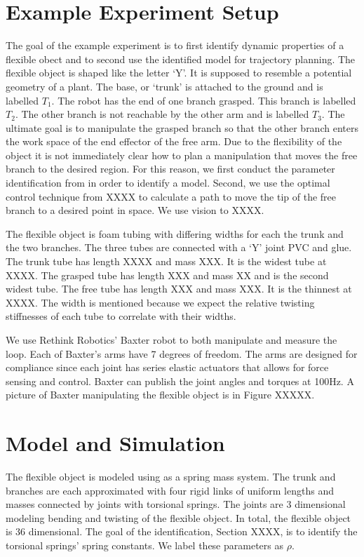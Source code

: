 \documentclass[runningheads,a4paper]{llncs}
\begin{document}
\section{Example Experiment Setup}
The goal of the example experiment is to first identify dynamic properties of a flexible obect and to second use the identified model for trajectory planning. The flexible object is shaped like the letter `Y'.  It is supposed to resemble a potential geometry of a plant. The base, or `trunk' is attached to the ground and is labelled $T_1$. The robot has the end of one branch grasped. This branch is labelled $T_2$.  The other branch is not reachable by the other arm and is labelled $T_3$. The ultimate goal is to manipulate the grasped branch so that the other branch enters the work space of the end effector of the free arm. Due to the flexibility of the object it is not immediately clear how to plan a manipulation that moves the free branch to the desired region. For this reason, we first conduct the parameter identification from \cite{caldwell_coleman_correll_iros} in order to identify a model.  Second, we use the optimal control technique from XXXX to calculate a path to move the tip of the free branch to a desired point in space.  We use vision to XXXX.

The flexible object is foam tubing with differing widths for each the trunk and the two branches. The three tubes are connected with a `Y' joint PVC and glue.  The trunk tube has length XXXX and mass XXX. It is the widest tube at XXXX. The grasped tube has length XXX and mass XX and is the second widest tube. The free tube has length XXX and mass XXX. It is the thinnest at XXXX.  The width is mentioned because we expect the relative twisting stiffnesses of each tube to correlate with their widths. 

We use Rethink Robotics' Baxter \cite{guizzo2011rethink} robot to both manipulate and measure the loop.  Each of Baxter's arms have 7 degrees of freedom.  The arms are designed for compliance since each joint has series elastic actuators that allows for force sensing and control.  Baxter can publish the joint angles and torques at 100Hz.  A picture of Baxter manipulating the flexible object is in Figure XXXXX. 

\section{Model and Simulation}
The flexible object is modeled using as a spring mass system. The trunk and branches are each approximated with four rigid links of uniform lengths and masses connected by joints with torsional springs. The joints are 3 dimensional modeling bending and twisting of the flexible object. In total, the flexible object is 36 dimensional. The goal of the identification, Section XXXX, is to identify the torsional springs' spring constants. We label these parameters as $\rho$.
\end{document}
